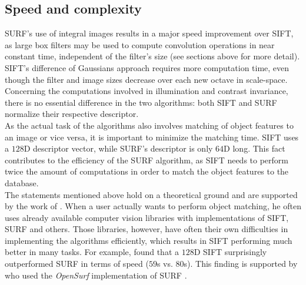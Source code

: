 \documentclass[a4paper, 11pt]{article} %
\begin{document}
\subsection{Speed and complexity}
SURF's use of integral images results in a major speed improvement over SIFT, as large box filters may be used to compute convolution operations in near constant time, independent of the filter's size \cite{bay2008speeded} (see sections above for more detail). SIFT's difference of Gaussians approach requires more computation time, even though the filter and image sizes decrease over each new octave in scale-space.\\
Concerning the computations involved in illumination and contrast invariance, there is no essential difference in the two algorithms: both SIFT and SURF normalize their respective descriptor. \\
As the actual task of the algorithms also involves matching of object features to an image or vice versa, it is important to minimize the matching time. SIFT uses a $128$D descriptor vector, while SURF's descriptor is only $64$D long. This fact contributes to the efficiency of the SURF algorithm, as SIFT needs to perform twice the amount of computations in order to match the object features to the database. \\
The statements mentioned above hold on a theoretical ground and are supported by the work of \cite{bay2008speeded}. When a user actually wants to perform object matching, he often uses already available computer vision libraries with implementations of SIFT, SURF and others. Those libraries, however, have often their own difficulties in implementing the algorithms efficiently, which results in SIFT performing much better in many tasks. For example, \citeauthor{khan2011sift} found that a $128$D SIFT surprisingly outperformed SURF in terms of speed ($59$s vs. $80$s). This finding is supported by \citeauthor{evans2009notes} who used the \textit{OpenSurf} implementation of SURF \cite{evans2009notes}. 


\end{document}
